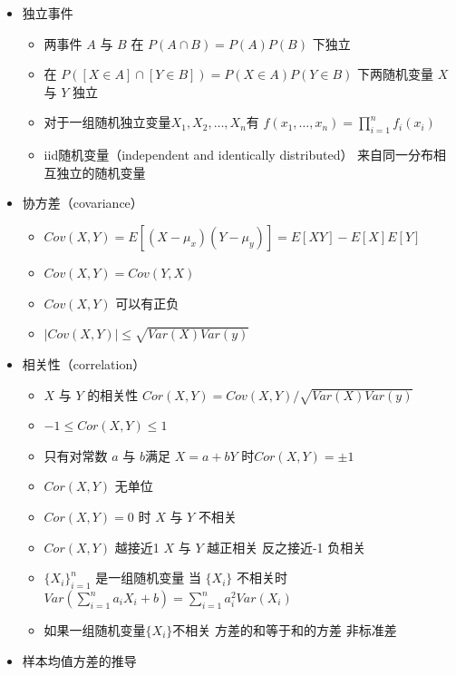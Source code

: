 \documentclass[
]{book}
\providecommand{\tightlist}{%
  \setlength{\itemsep}{0pt}\setlength{\parskip}{0pt}}
\begin{document}
\begin{itemize}
\item
  独立事件

  \begin{itemize}
  \tightlist
  \item
    两事件 \(A\) 与 \(B\) 在 \(P(A \cap B) = P(A)P(B)\) 下独立
  \item
    在 \(P([X \in A] \cap [Y \in B]) = P(X\in A)P(Y\in B)\) 下两随机变量 \(X\) 与 \(Y\) 独立
  \item
    对于一组随机独立变量\(X_1, X_2, \ldots, X_n\)有 \(f(x_1,\ldots, x_n) = \prod_{i=1}^n f_i(x_i)\)
  \item
    iid随机变量（independent and identically distributed） 来自同一分布相互独立的随机变量
  \end{itemize}
\item
  协方差（covariance）

  \begin{itemize}
  \tightlist
  \item
    \(Cov(X, Y) = E[(X - \mu_x)(Y - \mu_y)] = E[X Y] - E[X]E[Y]\)
  \item
    \(Cov(X, Y) = Cov(Y, X)\)
  \item
    \(Cov(X, Y)\) 可以有正负
  \item
    \(|Cov(X, Y)| \leq \sqrt{Var(X) Var(y)}\)
  \end{itemize}
\item
  相关性（correlation）

  \begin{itemize}
  \tightlist
  \item
    \(X\) 与 \(Y\) 的相关性 \(Cor(X, Y) = Cov(X, Y) / \sqrt{Var(X) Var(y)}\)
  \item
    \(-1 \leq Cor(X, Y) \leq 1\)
  \item
    只有对常数 \(a\) 与 \(b\)满足 \(X = a + bY\) 时\(Cor(X, Y) = \pm 1\)
  \item
    \(Cor(X, Y)\) 无单位
  \item
    \(Cor(X, Y) = 0\) 时 \(X\) 与 \(Y\) 不相关
  \item
    \(Cor(X,Y)\) 越接近1 \(X\) 与 \(Y\) 越正相关 反之接近-1 负相关
  \item
    \(\{X_i\}_{i=1}^n\) 是一组随机变量 当 \(\{X_i\}\) 不相关时 \(Var\left(\sum_{i=1}^n a_i X_i + b\right) = \sum_{i=1}^n a_i^2 Var(X_i)\)
  \item
    如果一组随机变量\(\{X_i\}\)不相关 方差的和等于和的方差 非标准差
  \end{itemize}
\item
  样本均值方差的推导


\end{itemize}
\end{document}
